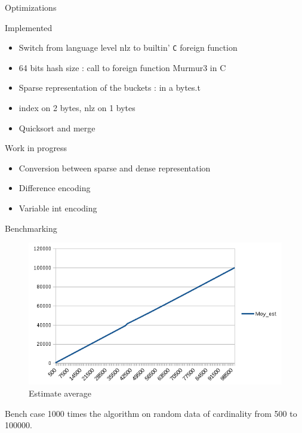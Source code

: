 \documentclass{beamer}
\begin{document}
\begin{frame}{Optimizations}
  \begin{block}{Implemented}
      \begin{itemize}
      \item Switch from language level nlz to builtin' \texttt{C}
        foreign function
      \item 64 bits hash size : call to foreign function Murmur3 in C
      \item Sparse representation of the buckets : in a bytes.t
      \item index on 2 bytes, nlz on 1 bytes
      \item Quicksort and merge
      \end{itemize}
  \end{block}

  \begin{alertblock}{Work in progress}
    \begin{itemize}
    \item Conversion between sparse and dense representation
    \item Difference encoding
    \item Variable int encoding
    \end{itemize}
  \end{alertblock}
\end{frame}


\begin{frame}{Benchmarking}
\begin{figure}[h!]
   \includegraphics[scale=0.4]{./moy.png}
   \caption{\label{figmoy}Estimate average}
  
\end{figure}

\begin{block}{Bench case}
1000 times the algorithm on random
data of cardinality from 500 to 100000.
\end{block}

\end{frame}
\end{document}
